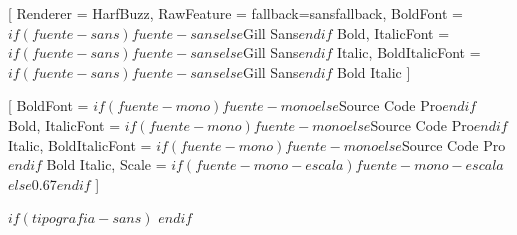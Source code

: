 \setsansfont{$if(fuente-sans)$$fuente-sans$$else$Gill Sans$endif$}[
  Renderer       = HarfBuzz,
  RawFeature     = {fallback=sansfallback},
  BoldFont       = {$if(fuente-sans)$$fuente-sans$$else$Gill Sans$endif$ Bold},
  ItalicFont     = {$if(fuente-sans)$$fuente-sans$$else$Gill Sans$endif$ Italic},
  BoldItalicFont = {$if(fuente-sans)$$fuente-sans$$else$Gill Sans$endif$ Bold Italic}
]

\setmonofont{$if(fuente-mono)$$fuente-mono$$else$Source Code Pro$endif$}[
  BoldFont       = {$if(fuente-mono)$$fuente-mono$$else$Source Code Pro$endif$ Bold},
  ItalicFont     = {$if(fuente-mono)$$fuente-mono$$else$Source Code Pro$endif$ Italic},
  BoldItalicFont = {$if(fuente-mono)$$fuente-mono$$else$Source Code Pro$endif$ Bold Italic},
  Scale          = $if(fuente-mono-escala)$$fuente-mono-escala$$else$0.67$endif$
]

$if(tipografia-sans)$
\renewcommand{\familydefault}{\sfdefault}
$endif$
